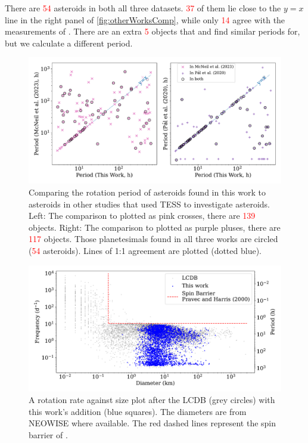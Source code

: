 \documentclass[12pt]{article}
\newcommand{\red}[1]{\textcolor{red}{#1}}
\begin{document}
There are \red{54} asteroids in both all three datasets. 
\red{37} of them lie close to the $y=x$ line in the right \citeauthor{Pal2020} panel of \autoref{fig:otherWorksComp}, while only \red{14} agree with the measurements of \citeauthor{McNeill2023}. 
There are an extra \red{5} objects that \citet{Pal2020} and \citet{McNeill2023} find similar periods for, but we calculate a different period. 

\begin{figure}
    \centering
    \includegraphics[width=\textwidth]{M23andP20CompPaperFigDraft.pdf}
    \caption{Comparing the rotation period of asteroids found in this work to asteroids in other studies that used TESS to investigate asteroids.
        Left: The comparison to \citet{McNeill2023} plotted as pink crosses, there are \red{139} objects.
        Right: The comparison to \citet{Pal2020} plotted as purple pluses, there are \red{117} objects.
        Those planetesimals found in all three works are circled (\red{54} asteroids).
        Lines of 1:1 agreement are plotted (dotted blue).}
    \label{fig:otherWorksComp}
\end{figure}



\begin{figure}
    \centering
    \includegraphics[width=\textwidth]{Diam-FreqPlotThisWorkPaperFigDraft.pdf}
    \caption{A rotation rate against size plot after the LCDB \citep{Warner2009} (grey
        circles) with this work's addition (blue squares). The
        diameters are from NEOWISE \citep{Masiero2011,NEOWISE2019} where available. The red dashed lines represent the spin barrier of \citep{Pravec2000}.}
    \label{fig:FreqDiam}
\end{figure}
\end{document}
